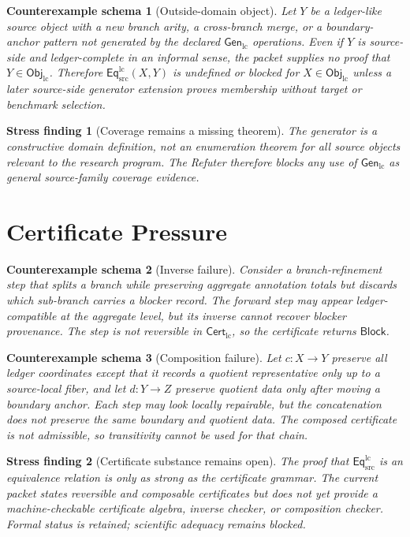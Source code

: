 \documentclass[11pt]{article}
\newcommand{\EqLC}{\mathsf{Eq}_{\mathrm{src}}^{\mathrm{lc}}}
\newcommand{\ObjLC}{\mathsf{Obj}_{\mathrm{lc}}}
\newcommand{\GenLC}{\mathsf{Gen}_{\mathrm{lc}}}
\newcommand{\CertLC}{\mathsf{Cert}_{\mathrm{lc}}}
\newcommand{\Block}{\mathsf{Block}}
\newtheorem{stressfinding}{Stress finding}
\newtheorem{counterexample}{Counterexample schema}
\begin{document}
\begin{counterexample}[Outside-domain object]
Let \(Y\) be a ledger-like source object with a new branch arity, a
cross-branch merge, or a boundary-anchor pattern not generated by the
declared \(\GenLC\) operations. Even if \(Y\) is source-side and
ledger-complete in an informal sense, the packet supplies no proof that
\(Y\in\ObjLC\). Therefore \(\EqLC(X,Y)\) is undefined or blocked for
\(X\in\ObjLC\) unless a later source-side generator extension proves
membership without target or benchmark selection.
\end{counterexample}

\begin{stressfinding}[Coverage remains a missing theorem]
The generator is a constructive domain definition, not an enumeration
theorem for all source objects relevant to the research program. The
Refuter therefore blocks any use of \(\GenLC\) as general source-family
coverage evidence.
\end{stressfinding}

\section{Certificate Pressure}

\begin{counterexample}[Inverse failure]
Consider a branch-refinement step that splits a branch while preserving
aggregate annotation totals but discards which sub-branch carries a
blocker record. The forward step may appear ledger-compatible at the
aggregate level, but its inverse cannot recover blocker provenance. The
step is not reversible in \(\CertLC\), so the certificate returns
\(\Block\).
\end{counterexample}

\begin{counterexample}[Composition failure]
Let \(c:X\to Y\) preserve all ledger coordinates except that it records a
quotient representative only up to a source-local fiber, and let
\(d:Y\to Z\) preserve quotient data only after moving a boundary anchor.
Each step may look locally repairable, but the concatenation does not
preserve the same boundary and quotient data. The composed certificate is
not admissible, so transitivity cannot be used for that chain.
\end{counterexample}

\begin{stressfinding}[Certificate substance remains open]
The proof that \(\EqLC\) is an equivalence relation is only as strong as
the certificate grammar. The current packet states reversible and
composable certificates but does not yet provide a machine-checkable
certificate algebra, inverse checker, or composition checker. Formal
status is retained; scientific adequacy remains blocked.
\end{stressfinding}
\end{document}
